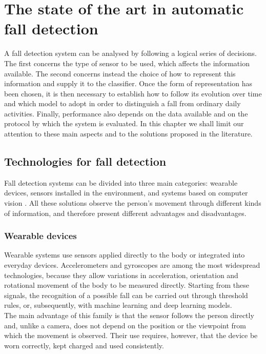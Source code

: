 \chapter{The state of the art in automatic fall detection}
\label{cap:stato_arte}

A fall detection system can be analysed by following a logical series of decisions. The first concerns the type of sensor to be used, which affects the information available.
The second concerns instead the choice of how to represent this information and supply it to the classifier. Once the form of representation has been chosen, it is then necessary to establish how to follow its evolution over time and which model to adopt in order to distinguish a fall from ordinary daily activities. Finally, performance also depends on the data available and on the protocol by which the system is evaluated.
In this chapter we shall limit our attention to these main aspects and to the solutions proposed in the literature.

\section{Technologies for fall detection}

Fall detection systems can be divided into three main categories: wearable devices, sensors installed in the environment, and systems based on computer vision \cite{MU}. All these solutions observe the person's movement through different kinds of information, and therefore present different advantages and disadvantages.

\subsection{Wearable devices}

Wearable systems use sensors applied directly to the body or integrated into everyday devices. Accelerometers and gyroscopes are among the most widespread technologies, because they allow variations in acceleration, orientation and rotational movement of the body to be measured directly.
Starting from these signals, the recognition of a possible fall can be carried out through threshold rules, or, subsequently, with machine learning and deep learning models.\\
The main advantage of this family is that the sensor follows the person directly and, unlike a camera, does not depend on the position or the viewpoint from which the movement is observed. Their use requires, however, that the device be worn correctly, kept charged and used consistently.

